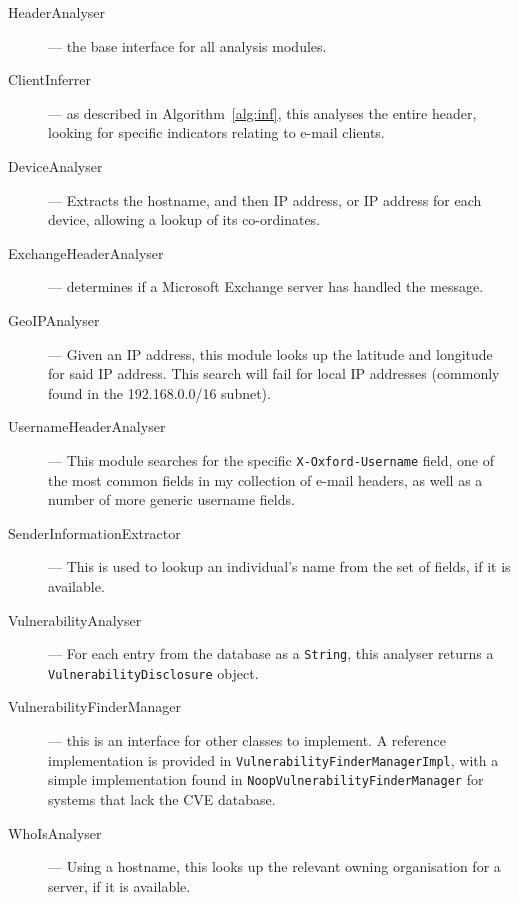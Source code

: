 \begin{description}
	\item[HeaderAnalyser] --- the base interface for all analysis modules.

	\item[ClientInferrer] --- as described in Algorithm~\ref{alg:inf}, this
		analyses the entire header, looking for specific indicators
		relating to e-mail clients.
		
	\item[DeviceAnalyser] --- Extracts the hostname, and then IP address, or
		IP address for each device, allowing a lookup of its
		co-ordinates.

	\item[ExchangeHeaderAnalyser] --- determines if a Microsoft Exchange
		server has handled the message.

	\item[GeoIPAnalyser] --- Given an IP address, this module looks up the
		latitude and longitude for said IP address.  This search will
		fail for local IP addresses (commonly found in the
		192.168.0.0/16 subnet).

	\item[UsernameHeaderAnalyser] --- This module searches for the specific
		\texttt{X-Oxford-Username} field, one of the most common fields
		in my collection of e-mail headers, as well as a number of more
		generic username fields.

	\item[SenderInformationExtractor] --- This is used to lookup an
		individual's name from the set of fields, if it is available.

	\item[VulnerabilityAnalyser] --- For each entry from the database as a
		\texttt{String}, this analyser returns a
		\texttt{VulnerabilityDisclosure} object.

	\item[VulnerabilityFinderManager] --- this is an interface for other
		classes to implement. A reference implementation is provided in
		\texttt{VulnerabilityFinderManagerImpl}, with a simple
		implementation found in \texttt{NoopVulnerabilityFinderManager}
		for systems that lack the CVE database.

	\item[WhoIsAnalyser] --- Using a hostname, this looks up the relevant
		owning organisation for a server, if it is available.
		
\end{description}

